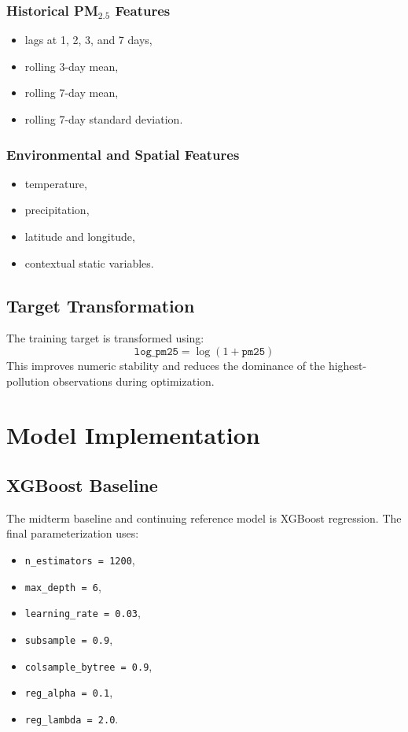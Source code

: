 \documentclass[12pt,a4paper]{report}
\begin{document}
\subsection{Historical PM$_{2.5}$ Features}
\begin{itemize}[leftmargin=1.3cm]
    \item lags at 1, 2, 3, and 7 days,
    \item rolling 3-day mean,
    \item rolling 7-day mean,
    \item rolling 7-day standard deviation.
\end{itemize}

\subsection{Environmental and Spatial Features}
\begin{itemize}[leftmargin=1.3cm]
    \item temperature,
    \item precipitation,
    \item latitude and longitude,
    \item contextual static variables.
\end{itemize}

\section{Target Transformation}
The training target is transformed using:
\[
\texttt{log\_pm25} = \log(1 + \texttt{pm25})
\]
This improves numeric stability and reduces the dominance of the highest-pollution observations during optimization.

\chapter{Model Implementation}

\section{XGBoost Baseline}
The midterm baseline and continuing reference model is XGBoost regression. The final parameterization uses:

\begin{itemize}[leftmargin=1.3cm]
    \item \texttt{n\_estimators = 1200},
    \item \texttt{max\_depth = 6},
    \item \texttt{learning\_rate = 0.03},
    \item \texttt{subsample = 0.9},
    \item \texttt{colsample\_bytree = 0.9},
    \item \texttt{reg\_alpha = 0.1},
    \item \texttt{reg\_lambda = 2.0}.
\end{itemize}
\end{document}
